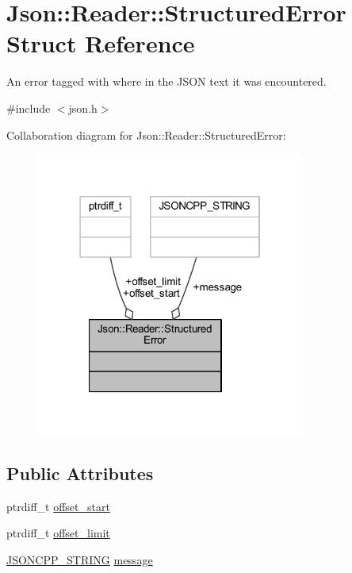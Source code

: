 \hypertarget{struct_json_1_1_reader_1_1_structured_error}{}\section{Json\+:\+:Reader\+:\+:Structured\+Error Struct Reference}
\label{struct_json_1_1_reader_1_1_structured_error}


An error tagged with where in the J\+S\+ON text it was encountered.  




{\ttfamily \#include $<$json.\+h$>$}



Collaboration diagram for Json\+:\+:Reader\+:\+:Structured\+Error\+:\nopagebreak
\begin{figure}[H]
\begin{center}
\leavevmode
\includegraphics[width=250pt]{struct_json_1_1_reader_1_1_structured_error__coll__graph}
\end{center}
\end{figure}
\subsection*{Public Attributes}
\begin{DoxyCompactItemize}
\item 
ptrdiff\+\_\+t \hyperlink{struct_json_1_1_reader_1_1_structured_error_ac98af0da2d704be4b64a9572a682423b}{offset\+\_\+start}
\item 
ptrdiff\+\_\+t \hyperlink{struct_json_1_1_reader_1_1_structured_error_ad76ac01aeb0ada7e882c2df5daa54c6e}{offset\+\_\+limit}
\item 
\hyperlink{json_8h_a1e723f95759de062585bc4a8fd3fa4be}{J\+S\+O\+N\+C\+P\+P\+\_\+\+S\+T\+R\+I\+NG} \hyperlink{struct_json_1_1_reader_1_1_structured_error_a2d2dc387aefe406a71de3daa263a38f4}{message}
\end{DoxyCompactItemize}


